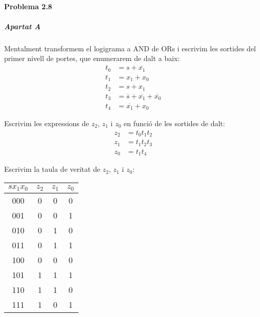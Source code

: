 \begin{center}
 \end{center}

\finishpage


\page
\paragraph{Problema 2.8} \hspace{0em}

\subparagraph{Apartat A}

Mentalment transformem el logigrama a \textsf{AND} de \textsf{OR}s i escrivim les sortides del primer nivell de portes, que enumerarem de dalt a baix:
%
\begin{align*}
  t_0 &= s + \overline{x_1} \\
  t_1 &= x_1 + x_0 \\
  t_2 &= s + x_1 \\
  t_3 &= \overline{s} + \overline{x_1} + \overline{x_0} \\
  t_4 &= \overline{x_1} + x_0
\end{align*}

Escrivim les expressions de $z_2$, $z_1$ i $z_0$ en funció de les sortides de dalt:
%
\begin{align*}
  z_2 &= t_0 t_1 t_2 \\
  z_1 &= t_1 t_2 t_3 \\
  z_0 &= t_1 t_4
\end{align*}

Escrivim la taula de veritat de $z_2$, $z_1$ i $z_0$:

\begin{center} \begin{tabular}{cccc}
$sx_1x_0$ & $z_2$ & $z_1$ & $z_0$ \\
\hline
000 & 0 & 0 & 0 \\
001 & 0 & 0 & 1 \\
010 & 0 & 1 & 0 \\
011 & 0 & 1 & 1 \\
100 & 0 & 0 & 0 \\
101 & 1 & 1 & 1 \\
110 & 1 & 1 & 0 \\
111 & 1 & 0 & 1
\end{tabular} \end{center}

